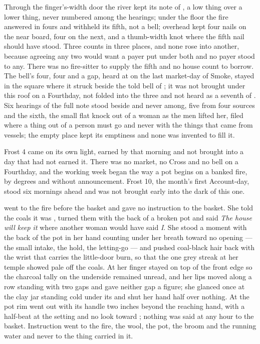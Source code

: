 Through the finger's-width door the river kept its note of , a low thing over a lower thing, never numbered among the hearings; under the floor the fire answered in fours and withheld its fifth, not a bell; overhead  kept four nails on the near board, four on the next, and a thumb-width knot where the fifth nail should have stood. Three counts in three places, and none rose into another, because agreeing any two would want a payer put under both and no payer stood to any. There was no fire-sitter to supply the fifth and no house count to borrow. The bell's four, four and a gap, heard at  on the last market-day of Smoke, stayed in the square where it struck beside the told bell of ; it was not brought under this roof on a Fourthday, not folded into the three and not heard as a seventh of . Six hearings of the full note stood beside and never among, five from four sources and the sixth, the small flat knock out of a woman as the men lifted her, filed where a thing out of a person must go and never with the things that came from vessels; the empty place kept its emptiness and none was invented to fill it.

\scenebreak

Frost 4 came on its own light, earned by that morning and not brought into a day that had not earned it. There was no market, no Cross and no bell on a Fourthday, and the working week began the way a pot begins on a banked fire, by degrees and without announcement. Frost 10, the month's first Account-day, stood six mornings ahead and was not brought early into the dark of this one.

 went to the fire before the basket and gave no instruction to the basket. She told the coals it was , turned them with the back of a broken pot and said \emph{The house will keep it} where another woman would have said \emph{I}. She stood a moment with the back of the pot in her hand counting under her breath toward no opening --- the small intake, the hold, the letting-go --- and pushed coal-black hair back with the wrist that carries the little-door burn, so that the one grey streak at her temple showed pale off the coals. At  her finger stayed on top of the front edge so the charcoal tally on the underside remained unread, and her lips moved along a row standing with two gaps and gave neither gap a figure; she glanced once at the clay jar standing cold under its  and shut her hand half over nothing. At  the pot rim went out with its handle two inches beyond the reaching hand, with a half-beat at the setting and no look toward ; nothing was said at any hour to the basket. Instruction went to the fire, the wool, the pot, the broom and the running water and never to the thing carried in it.

